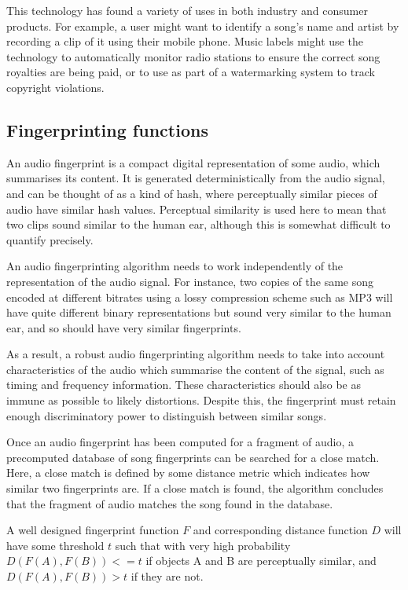 \documentclass[12pt,a4paper,twoside,openright]{report}
\begin{document}
This technology has found a variety of uses in both industry and consumer products. For example, a user might want to identify a song's name and artist by recording a clip of it using their mobile phone. Music labels might use the technology to automatically monitor radio stations to ensure the correct song royalties are being paid, or to use as part of a watermarking system to track copyright violations.


\subsection{Fingerprinting functions}

An audio fingerprint is a compact digital representation of some audio, which summarises its content. It is generated deterministically from the audio signal, and can be thought of as a kind of hash, where perceptually similar pieces of audio have similar hash values. Perceptual similarity is used here to mean that two clips sound similar to the human ear, although this is somewhat difficult to quantify precisely.

An audio fingerprinting algorithm needs to work independently of the representation of the audio signal. For instance, two copies of the same song encoded at different bitrates using a lossy compression scheme such as MP3  will have quite different binary representations but sound very similar to the human ear, and so should have very similar fingerprints.

As a result, a robust audio fingerprinting algorithm needs to take into account characteristics of the audio which summarise the content of the signal, such as timing and frequency information. These characteristics should also be as immune as possible to likely distortions. Despite this, the fingerprint must retain enough discriminatory power to distinguish between similar songs.

Once an audio fingerprint has been computed for a fragment of audio, a precomputed database of song fingerprints can be searched for a close match. Here, a close match is defined by some distance metric which indicates how similar two fingerprints are. If a close match is found, the algorithm concludes that the fragment of audio matches the song found in the database.

A well designed fingerprint function $F$ and corresponding distance function $D$ will have some threshold $t$ such that with very high probability $D(F(A),F(B)) <= t$ if objects A and B are perceptually similar, and $D(F(A),F(B)) > t$ if they are not.
\end{document}
